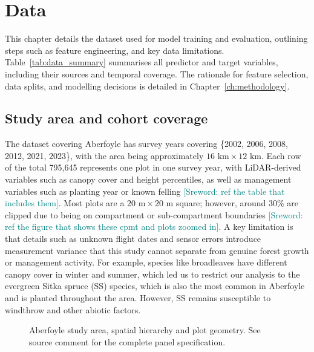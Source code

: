 \documentclass[11pt,a4paper]{report}
\newcommand{\sr}[1]{\textcolor{teal}{[Sreword: #1]}}
\begin{document}
\chapter{Data}
\label{ch:data}

This chapter details the dataset used for model training and evaluation, outlining steps such as feature engineering, and key data limitations. Table~\ref{tab:data_summary} summarises all predictor and target variables, including their sources and temporal coverage. The rationale for feature selection, data splits, and modelling decisions is detailed in Chapter~\ref{ch:methodology}.


\section{Study area and cohort coverage}
\label{sec:data-source}

The dataset covering Aberfoyle has survey years covering \{2002, 2006, 2008, 2012, 2021, 2023\}, with the area being approximately $16\text{~km} \times 12\text{~km}$. Each row of the total 795,645 represents one plot in one survey year, with LiDAR-derived variables such as canopy cover and height percentiles, as well as management variables such as planting year or known felling \sr{ref the table that includes them}. Most plots are a $20\text{~m} \times 20\text{~m}$ square; however, around 30\% are clipped due to being on compartment or sub-compartment boundaries \sr{ref the figure that shows these cpmt and plots zoomed in}. A key limitation is that details such as unknown flight dates and sensor errors introduce measurement variance that this study cannot separate from genuine forest growth or management activity. For example, species like broadleaves have different canopy cover in winter and summer, which led us to restrict our analysis to the evergreen Sitka spruce (SS) species, which is also the most common in Aberfoyle and is planted throughout the area. However, SS remains susceptible to windthrow and other abiotic factors.

\begin{figure}[!htbp] %
\caption{Aberfoyle study area, spatial hierarchy and plot geometry. See source comment for the
complete panel specification.}
\label{fig:data-study-area}
\end{figure}
\end{document}
